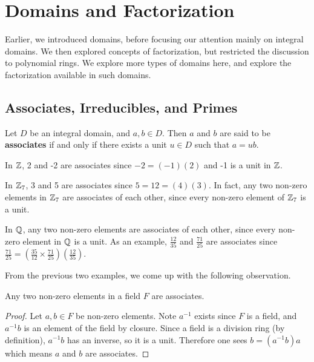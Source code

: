 \chapter{Domains and Factorization}
Earlier, we introduced domains, before focusing our attention mainly on integral domains. We then explored concepts of factorization, but restricted the discussion to polynomial rings. We explore more types of domains here, and explore the factorization available in such domains.

\section{Associates, Irreducibles, and Primes}
\begin{definition}
    Let $D$ be an integral domain, and $a,b \in D$. Then $a$ and $b$ are said to be \textbf{associates} if and only if there exists a unit $u \in D$ such that $a = ub$.
\end{definition}

\begin{example}
    In $\mathbb{Z}$, 2 and -2 are associates since $-2 = (-1)(2)$ and -1 is a unit in $\mathbb{Z}$.
\end{example}

\begin{example}
    In $\mathbb{Z}_7$, 3 and 5 are associates since $5 = 12 = (4)(3)$. In fact, any two non-zero elements in $\mathbb{Z}_7$ are associates of each other, since every non-zero element of $\mathbb{Z}_7$ is a unit.
\end{example}

\begin{example}
    In $\mathbb{Q}$, any two non-zero elements are associates of each other, since every non-zero element in $\mathbb{Q}$ is a unit. As an example, $\frac{12}{35}$ and $\frac{71}{25}$ are associates since $\frac{71}{25} = \left(\frac{35}{12} \times \frac{71}{25}\right)\left(\frac{12}{35}\right)$.
\end{example}

From the previous two examples, we come up with the following observation.

\begin{proposition}
    Any two non-zero elements in a field $F$ are associates.
\end{proposition}
\begin{proof}
    Let $a, b \in F$ be non-zero elements. Note $a^{-1}$ exists since $F$ is a field, and $a^{-1}b$ is an element of the field by closure. Since a field is a division ring (by definition), $a^{-1}b$ has an inverse, so it is a unit. Therefore one sees $b = (a^{-1}b)a$ which means $a$ and $b$ are associates.
\end{proof}

